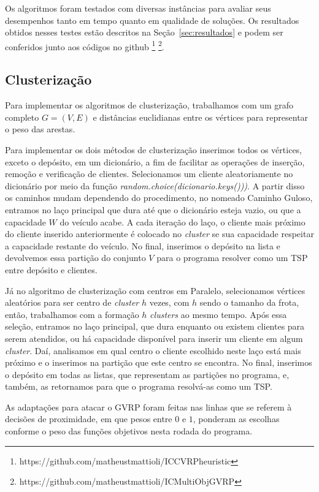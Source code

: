 \documentclass[12pt, a4paper]{article}
\begin{document}
Os algoritmos foram testados com diversas instâncias para avaliar seus desempenhos tanto em tempo quanto em qualidade de soluções. Os resultados obtidos nesses testes estão descritos na Seção~\ref{sec:resultados} e podem ser conferidos junto aos códigos no github \footnote{https://github.com/matheustmattioli/ICCVRPheuristic} \footnote{https://github.com/matheustmattioli/ICMultiObjGVRP}. 


\subsection{Clusterização}

Para implementar os algoritmos de clusterização, trabalhamos com um grafo completo $G = (V, E)$ e distâncias euclidianas entre os vértices para representar o peso das arestas.\par
Para implementar os dois métodos de clusterização inserimos todos os vértices, exceto o depósito, em um dicionário, a fim de facilitar as operações de inserção, remoção e verificação de clientes. Selecionamos um cliente aleatoriamente no dicionário por meio da função \textit{random.choice(dicionario.keys()))}. A partir disso os caminhos mudam dependendo do procedimento, no nomeado Caminho Guloso, entramos no laço principal que dura até que o dicionário esteja vazio, ou que a capacidade $W$ do veículo acabe. A cada iteração do laço, o cliente mais próximo do cliente inserido anteriormente é colocado no \textit{cluster} se sua capacidade respeitar a capacidade restante do veículo. No final, inserimos o depósito na lista e devolvemos essa partição do conjunto $V$ para o programa resolver como um TSP entre depósito e clientes.\par
Já no algoritmo de clusterização com centros em Paralelo, selecionamos vértices aleatórios para ser centro de \textit{cluster} $h$ vezes, com $h$ sendo o tamanho da frota, então, trabalhamos com a formação $h$ \textit{clusters} ao mesmo tempo. Após essa seleção, entramos no laço principal, que dura enquanto ou existem clientes para serem atendidos, ou há capacidade disponível para inserir um cliente em algum \textit{cluster}. Daí, analisamos em qual centro o cliente escolhido neste laço está mais próximo e o inserimos na partição que este centro se encontra. No final, inserimos o depósito em todas as listas, que representam as partições no programa, e, também, as retornamos para que o programa resolvá-as como um TSP.\par
As adaptações para atacar o GVRP foram feitas nas linhas que se referem à decisões de proximidade, em que pesos entre $0$ e $1$, ponderam as escolhas conforme o peso das funções objetivos nesta rodada do programa.
\end{document}

